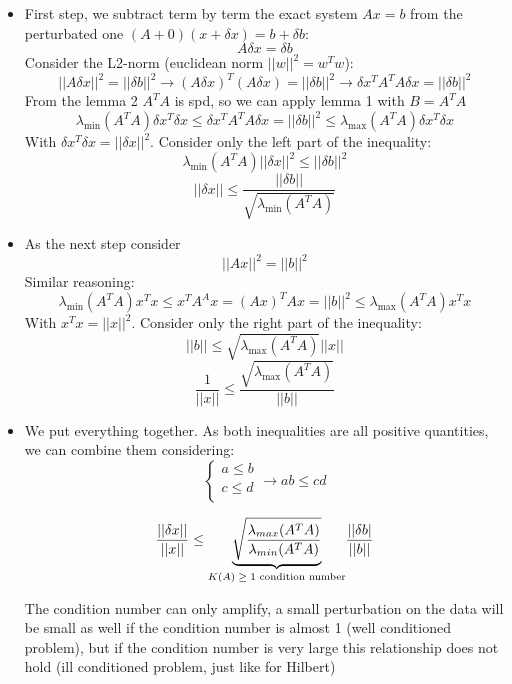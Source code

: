 \begin{itemize}
    \item First step, we subtract term by term the exact system $Ax=b$ from the perturbated one $(A+0)(x+\delta x)=b+\delta b$:
    $$
    A\delta x = \delta b
    $$
    Consider the L2-norm (euclidean norm $||w||^2=w^Tw$):
    $$
    ||A\delta x||^2 = ||\delta b||^2\rightarrow
    (A\delta x)^T(A\delta x)=||\delta b||^2\rightarrow
    \delta x^TA^TA\delta x=||\delta b||^2
    $$
    From the lemma 2 $A^TA$ is spd, so we can apply lemma 1 with $B=A^TA$
    $$
    \lambda_{\min}(A^TA)\delta x^T\delta x\leq
    \delta x^TA^TA\delta x=||\delta b||^2\leq
    \lambda_{\max}(A^TA)\delta x^T\delta x
    $$
    With $\delta x^T\delta x=||\delta x||^2$. Consider only the left part of the inequality:
    $$
    \lambda_{\min}(A^TA)||\delta x||^2\leq||\delta b||^2
    $$
    $$
    ||\delta x||\leq
    \frac{
        ||\delta b||
    }{
        \sqrt{\lambda_{\min}(A^TA)}
    }
    $$
    \item As the next step consider
    $$
    ||Ax||^2=||b||^2
    $$
    Similar reasoning:
    $$
    \lambda_{\min}(A^TA)x^Tx\leq
    x^TA^Ax=(Ax)^TAx=||b||^2\leq
    \lambda_{\max}(A^TA)x^Tx
    $$
    With $x^Tx=||x||^2$. Consider only the right part of the inequality:
    $$
    ||b||\leq\sqrt{\lambda_{\max}(A^TA)}||x||
    $$
    $$
    \frac{1}{||x||}\leq\frac{\sqrt{\lambda_{\max}(A^TA)}}{||b||}
    $$
    \item We put everything together. As both inequalities are all positive quantities, we can combine them considering:
    $$
    \begin{cases}
        a\leq b\\
        c\leq d\\
    \end{cases}
    \rightarrow ab\leq cd
    $$
    \begin{LARGE}        
        $$
        \frac{||\delta x||}{||x||}\leq
        \underlabel{
            \sqrt{\frac{
                \lambda_{max}(A^TA)
            }{\lambda_{min}(A^TA)}}
        }{$K(A)\geq 1$ condition number}    
        \frac{||\delta b|}{||b||}
        $$
    \end{LARGE}

    The condition number can only amplify, a small perturbation on the data will be small as well if the condition number is almost 1 (well conditioned problem), but if the condition number is very large this relationship does not hold (ill conditioned problem, just like for Hilbert)
\end{itemize}

